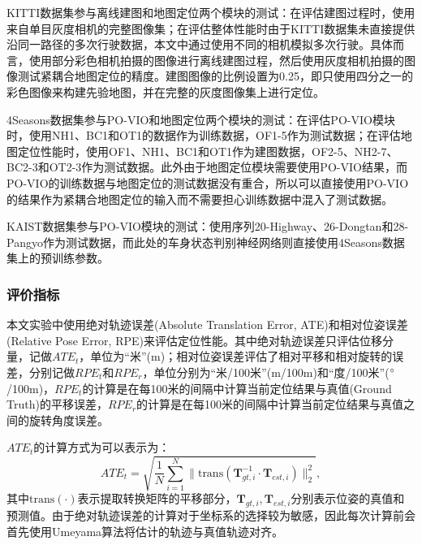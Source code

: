 KITTI数据集参与离线建图和地图定位两个模块的测试：在评估建图过程时，使用来自单目灰度相机的完整图像集；在评估整体性能时由于KITTI数据集未直接提供沿同一路径的多次行驶数据，本文中通过使用不同的相机模拟多次行驶。具体而言，使用部分彩色相机拍摄的图像进行离线建图过程，然后使用灰度相机拍摄的图像测试紧耦合地图定位的精度。建图图像的比例设置为0.25，即只使用四分之一的彩色图像来构建先验地图，并在完整的灰度图像集上进行定位。

4Seasons数据集参与PO-VIO和地图定位两个模块的测试：在评估PO-VIO模块时，使用NH1、BC1和OT1的数据作为训练数据，OF1-5作为测试数据；在评估地图定位性能时，使用OF1、NH1、BC1和OT1作为建图数据，OF2-5、NH2-7、BC2-3和OT2-3作为测试数据。此外由于地图定位模块需要使用PO-VIO结果，而PO-VIO的训练数据与地图定位的测试数据没有重合，所以可以直接使用PO-VIO的结果作为紧耦合地图定位的输入而不需要担心训练数据中混入了测试数据。

KAIST数据集参与PO-VIO模块的测试：使用序列20-Highway、26-Dongtan和28-Pangyo作为测试数据，而此处的车身状态判别神经网络则直接使用4Seasons数据集上的预训练参数。

\subsubsection{评价指标}

本文实验中使用绝对轨迹误差(Absolute Translation Error, ATE)\cite{sturm2012benchmark}和相对位姿误差(Relative Pose Error, RPE)\cite{geiger2012we}来评估定位性能。其中绝对轨迹误差只评估位移分量，记做$ATE_t$，单位为“米”(m)；相对位姿误差评估了相对平移和相对旋转的误差，分别记做$RPE_{t}$和$RPE_{r}$，单位分别为“米/100米”(m/100m)和“度/100米”($\degree$/100m)，$RPE_{t}$的计算是在每100米的间隔中计算当前定位结果与真值(Ground Truth)的平移误差，$RPE_{r}$的计算是在每100米的间隔中计算当前定位结果与真值之间的旋转角度误差。

$ATE_t$的计算方式为可以表示为：
\begin{equation}
  ATE_t = \sqrt{\frac{1}{N}\sum_{i=1}^{N}\|\text{trans}(\symbf{T}_{gt,i}^{-1}\cdot \symbf{T}_{est,i})\|^{2}_{2}},
\end{equation}
其中$\text{trans}(\cdot)$表示提取转换矩阵的平移部分，$\symbf{T}_{gt,i}, \symbf{T}_{est,i}$分别表示位姿的真值和预测值。由于绝对轨迹误差的计算对于坐标系的选择较为敏感，因此每次计算前会首先使用Umeyama算法\cite{arun1987least}将估计的轨迹与真值轨迹对齐。

